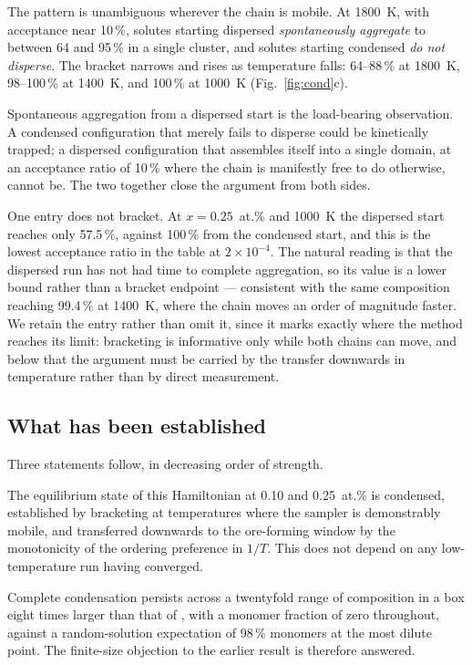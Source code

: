 \documentclass[11pt,a4paper]{article}
\begin{document}
The pattern is unambiguous wherever the chain is mobile. At 1800~K, with
acceptance near 10\,\%, solutes starting dispersed \emph{spontaneously
aggregate} to between 64 and 95\,\% in a single cluster, and solutes starting
condensed \emph{do not disperse}. The bracket narrows and rises as temperature
falls: 64--88\,\% at 1800~K, 98--100\,\% at 1400~K, and 100\,\% at 1000~K
(Fig.~\ref{fig:cond}c).

Spontaneous aggregation from a dispersed start is the load-bearing observation.
A condensed configuration that merely fails to disperse could be kinetically
trapped; a dispersed configuration that assembles itself into a single domain,
at an acceptance ratio of 10\,\% where the chain is manifestly free to do
otherwise, cannot be. The two together close the argument from both sides.

One entry does not bracket. At $x = 0.25$~at.\% and 1000~K the dispersed start
reaches only 57.5\,\%, against 100\,\% from the condensed start, and this is
the lowest acceptance ratio in the table at $2\times10^{-4}$. The natural
reading is that the dispersed run has not had time to complete aggregation, so
its value is a lower bound rather than a bracket endpoint --- consistent with the
same composition reaching 99.4\,\% at 1400~K, where the chain moves an order of
magnitude faster. We retain the entry rather than omit it, since it marks
exactly where the method reaches its limit: bracketing is informative only while
both chains can move, and below that the argument must be carried by the
transfer downwards in temperature rather than by direct measurement.

\subsection{What has been established}
\label{sec:establishedcond}

Three statements follow, in decreasing order of strength.

The equilibrium state of this Hamiltonian at 0.10 and 0.25~at.\% is condensed,
established by bracketing at temperatures where the sampler is demonstrably
mobile, and transferred downwards to the ore-forming window by the monotonicity
of the ordering preference in $1/T$. This does not depend on any low-temperature
run having converged.

Complete condensation persists across a twentyfold range of composition in a box
eight times larger than that of \citet{yu2026}, with a monomer fraction of zero
throughout, against a random-solution expectation of 98\,\% monomers at the most
dilute point. The finite-size objection to the earlier result is therefore
answered.
\end{document}
